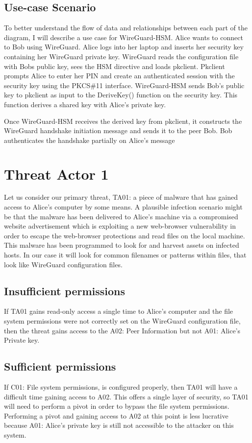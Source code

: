 \documentclass [11pt, proquest] {uwthesis}[2020/02/24]
\begin{document}
\subsection{Use-case Scenario}
To better understand the flow of data and relationships between each part of the diagram, I will describe a use case for WireGuard-HSM.
Alice wants to connect to Bob using WireGuard. Alice logs into her laptop and inserts her security key containing her WireGuard private key. WireGuard reads the configuration file with Bobs public key, sees the HSM directive and loads pkclient. Pkclient prompts Alice to enter her PIN and create an authenticated session with the security key using the PKCS\#11 interface. WireGuard-HSM sends Bob's public key to pkclient as input to the DeriveKey() function on the security key. This function derives a shared key with Alice's private key.

Once WireGuard-HSM receives the derived key from pkclient, it constructs the WireGuard handshake initiation message and sends it to the peer Bob. Bob authenticates the handshake partially on Alice's message

\section{Threat Actor 1}
Let us consider our primary threat, TA01: a piece of malware that has gained access to Alice's computer by some means. A plausible infection scenario might be that the malware has been delivered to Alice's machine via a compromised website advertisement which is exploiting a new web-browser vulnerability in order to escape the web-browser protections and read files on the local machine.  This malware has been programmed to look for and harvest assets on infected hosts. In our case it will look for common filenames or patterns within files, that look like WireGuard configuration files.  

\subsection{Insufficient permissions}
If TA01 gains read-only access a single time to Alice's computer and the file system permissions were not correctly set on the WireGuard configuration file, then the threat gains access to the A02: Peer Information but not A01: Alice's Private key.

\subsection{Sufficient permissions}
If C01: File system permissions, is configured properly, then TA01 will have a difficult time gaining access to A02. This offers a single layer of security, so TA01 will need to perform a pivot in order to bypass the file system permissions. Performing a pivot and gaining access to A02 at this point is less lucrative because A01: Alice's private key is still not accessible to the attacker on this system.
\end{document}
